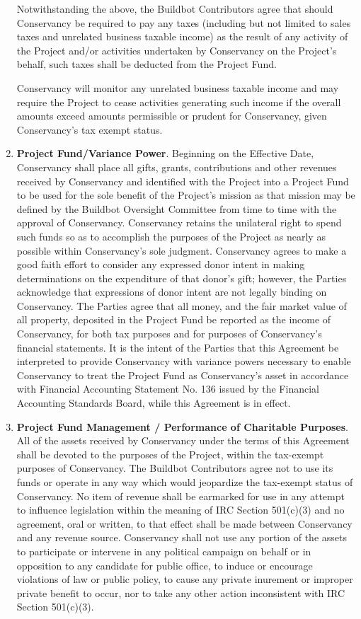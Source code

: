 \documentclass[letterpaper,12pt]{article}
\begin{document}
\begin{enumerate}[label=\arabic*.,ref=\S~\arabic*]
Notwithstanding the above, the Buildbot Contributors agree that should Conservancy
be required to pay any taxes (including but not limited to sales taxes
and unrelated business taxable income) as the result of any activity
of the Project and/or activities undertaken by Conservancy on the
Project's behalf, such taxes shall be deducted from the Project Fund.


Conservancy will monitor any unrelated business taxable income and
may require the Project to cease activities generating such income
if the overall amounts exceed amounts permissible or prudent for Conservancy,
given Conservancy's tax exempt status.

\item \textbf{Project Fund/Variance Power}. Beginning on the Effective Date,
Conservancy shall place all gifts, grants, contributions and other
revenues received by Conservancy and identified with the Project into
a Project Fund to be used for the sole benefit of the Project's mission
as that mission may be defined by the Buildbot Oversight Committee from
time to time with the approval of Conservancy. Conservancy retains
the unilateral right to spend such funds so as to accomplish the purposes
of the Project as nearly as possible within Conservancy's sole judgment.
Conservancy agrees to make a good faith effort to consider any expressed
donor intent in making determinations on the expenditure of that donor's
gift; however, the Parties acknowledge that expressions of donor intent
are not legally binding on Conservancy. The Parties agree that all
money, and the fair market value of all property, deposited in the
Project Fund be reported as the income of Conservancy, for both tax
purposes and for purposes of Conservancy's financial statements. It
is the intent of the Parties that this Agreement be interpreted to
provide Conservancy with variance powers necessary to enable Conservancy
to treat the Project Fund as Conservancy's asset in accordance with
Financial Accounting Statement No. 136 issued by the Financial Accounting
Standards Board, while this Agreement is in effect. 
\item \textbf{Project Fund Management / Performance of Charitable Purposes}.
\label{CharitablePurpose} All of the assets received by Conservancy
under the terms of this Agreement shall be devoted to the purposes
of the Project, within the tax-exempt purposes of Conservancy. The
Buildbot Contributors agree not to use its funds or operate in any way which would
jeopardize the tax-exempt status of Conservancy. No item of revenue
shall be earmarked for use in any attempt to influence legislation
within the meaning of IRC Section 501(c)(3) and no agreement, oral
or written, to that effect shall be made between Conservancy and any
revenue source. Conservancy shall not use any portion of the assets
to participate or intervene in any political campaign on behalf or
in opposition to any candidate for public office, to induce or encourage
violations of law or public policy, to cause any private inurement
or improper private benefit to occur, nor to take any other action
inconsistent with IRC Section 501(c)(3). 


\end{enumerate}
\end{document}
